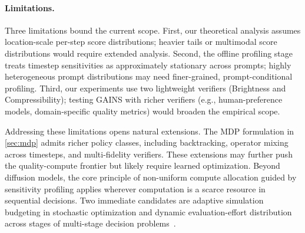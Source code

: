 \paragraph{Limitations.}
Three limitations bound the current scope.
First, our theoretical analysis assumes location-scale per-step score
distributions; heavier tails or multimodal score distributions would require
extended analysis.
Second, the offline profiling stage treats timestep sensitivities as
approximately stationary across prompts; highly heterogeneous prompt
distributions may need finer-grained, prompt-conditional profiling.
Third, our experiments use two lightweight verifiers (Brightness and
Compressibility); testing GAINS with richer verifiers (e.g.,
human-preference models, domain-specific quality metrics) would broaden the
empirical scope.

Addressing these limitations opens natural extensions.
The MDP formulation in \cref{sec:mdp} admits richer policy classes,
including backtracking, operator mixing across timesteps, and
multi-fidelity verifiers.
These extensions may further push the quality-compute frontier but
likely require learned optimization.
Beyond diffusion models, the core principle of non-uniform compute
allocation guided by sensitivity profiling applies wherever computation
is a scarce resource in sequential decisions.
Two immediate candidates are adaptive simulation budgeting in stochastic
optimization and dynamic evaluation-effort distribution across stages of
multi-stage decision problems~\citep{chen2000simulation}.
